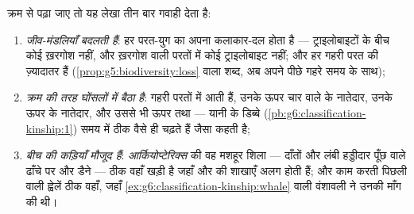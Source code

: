 \begin{proposition}[परतों का लेखा क्या दिखाता है]\label{prop:g9:evidence-of-evolution:record}
क्रम से पढ़ा जाए तो यह लेखा तीन बार गवाही देता है:
\begin{enumerate}
  \item \emph{जीव-मंडलियाँ बदलती हैं}: हर परत-युग का अपना कलाकार-दल
        होता है --- ट्राइलोबाइटों के बीच कोई ख़रगोश नहीं, और ख़रगोश
        वाली परतों में कोई ट्राइलोबाइट नहीं; और हर गहरी परत की
        ज़्यादातर  \emph{} हैं
        (\cref{prop:g5:biodiversity:loss} वाला शब्द, अब अपने पीछे गहरे
        समय के साथ);
  \item \emph{क्रम  की तरह घोंसलों में बैठा है}:  गहरी
        परतों में आती हैं, उनके ऊपर चार  वाले  के नातेदार,
        उनके ऊपर  के नातेदार, और उससे भी ऊपर  तथा 
        --- यानी  के डिब्बे
        (\cref{pb:g6:classification-kinship:1}) समय में ठीक वैसे ही
        चढ़ते हैं जैसा  कहती है;
  \item \emph{बीच की कड़ियाँ मौजूद हैं}: \emph{आर्कियोप्टेरिक्स} की वह
        मशहूर शिला --- दाँतों और लंबी हड्डीदार पूँछ वाले  ढाँचे पर
         और डैने --- ठीक वहाँ खड़ी है जहाँ  और  की शाखाएँ
        अलग होती हैं; और काम करती पिछली  वाली  ह्वेलें
        ठीक वहाँ, जहाँ \cref{ex:g6:classification-kinship:whale} वाली
         वंशावली ने उनकी माँग की थी।
\end{enumerate}
\end{proposition}
\admitted

